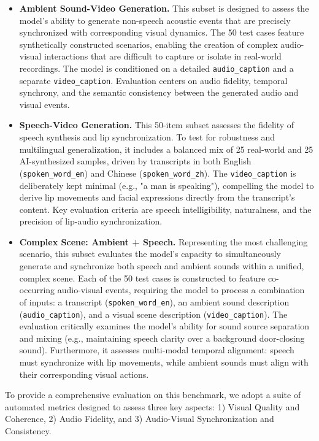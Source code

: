 \begin{itemize}
    \item \textbf{Ambient Sound-Video Generation.} This subset is designed to assess the model's ability to generate non-speech acoustic events that are precisely synchronized with corresponding visual dynamics. The 50 test cases feature synthetically constructed scenarios, enabling the creation of complex audio-visual interactions that are difficult to capture or isolate in real-world recordings. The model is conditioned on a detailed \texttt{audio\_caption} and a separate \texttt{video\_caption}. Evaluation centers on audio fidelity, temporal synchrony, and the semantic consistency between the generated audio and visual events.

    \item \textbf{Speech-Video Generation.} This 50-item subset assesses the fidelity of speech synthesis and lip synchronization. To test for robustness and multilingual generalization, it includes a balanced mix of 25 real-world and 25 AI-synthesized samples, driven by transcripts in both English (\texttt{spoken\_word\_en}) and Chinese (\texttt{spoken\_word\_zh}). The \texttt{video\_caption} is deliberately kept minimal (e.g., "a man is speaking"), compelling the model to derive lip movements and facial expressions directly from the transcript's content. Key evaluation criteria are speech intelligibility, naturalness, and the precision of lip-audio synchronization.

    \item \textbf{Complex Scene: Ambient + Speech.} Representing the most challenging scenario, this subset evaluates the model's capacity to simultaneously generate and synchronize both speech and ambient sounds within a unified, complex scene. Each of the 50 test cases is constructed to feature co-occurring audio-visual events, requiring the model to process a combination of inputs: a transcript (\texttt{spoken\_word\_en}), an ambient sound description (\texttt{audio\_caption}), and a visual scene description (\texttt{video\_caption}). The evaluation critically examines the model's ability for sound source separation and mixing (e.g., maintaining speech clarity over a background door-closing sound). Furthermore, it assesses multi-modal temporal alignment: speech must synchronize with lip movements, while ambient sounds must align with their corresponding visual actions.
\end{itemize}

To provide a comprehensive evaluation on this benchmark, we adopt a suite of automated metrics designed to assess three key aspects: 1) Visual Quality and Coherence, 2) Audio Fidelity, and 3) Audio-Visual Synchronization and Consistency.


